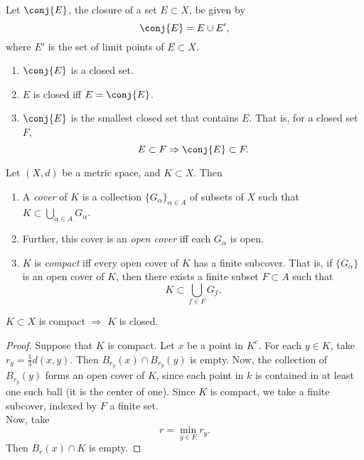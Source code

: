 \documentclass{notes}
\begin{document}
\begin{defn}
  Let $\conj{E}$, the closure of a set $E\subset X$, be given by $$\conj{E} = E \cup E',$$ where $E'$
  is the set of limit points of $E\subset X$.
\end{defn}
\begin{theorem}\leavevmode
  \begin{enumerate}
    \item $\conj{E}$ is a closed set.
    \item $E$ is closed iff $E = \conj{E}$.
    \item $\conj{E}$ is the smallest closed set that contains $E$. That is, for a closed set $F$,
    $$E\subset F \Rightarrow \conj{E}\subset F.$$
  \end{enumerate}
\end{theorem}

\begin{defn}
  Let $(X,d)$ be a metric space, and $K\subset X$. Then 
  \begin{enumerate}
    \item A \emph{cover} of $K$ is a collection $\{G_\alpha\}_{\alpha\in A}$ of subsets of $X$ such 
      that $K \subset \bigcup_{\alpha\in A}G_\alpha$.
    \item Further, this cover is an \emph{open cover} iff each $G_\alpha$ is open.  
    \item $K$ is \emph{compact} iff every open cover of $K$ has a finite subcover. That is, if 
      $\{G_\alpha\}$ is an open cover of $K$, then there exists a finite subset $F\subset A$ such that
      $$K\subset \bigcup_{f\in F}G_f.$$
  \end{enumerate}
\end{defn}

\begin{theorem}
  $K\subset X$ is compact $\Rightarrow$ $K$ is closed.
\end{theorem}
\begin{proof}
  Suppose that $K$ is compact. Let $x$ be a point in $K^c$. For each $y\in K$, take $r_y = \frac{1}{3}
  d(x,y)$. Then $B_{r_y}(x)\cap B_{r_y}(y)$ is empty. Now, the collection of $B_{r_y}(y)$ forms an open
  cover of $K$, since each point in $k$ is contained in at least one such ball (it is the center of 
  one). Since $K$ is compact, we take a finite subcover, indexed by $F$ a finite set. \\

  Now, take $$r = \min_{y\in F}r_y.$$ Then $B_r(x) \cap K$ is empty.
\end{proof}
\end{document}
